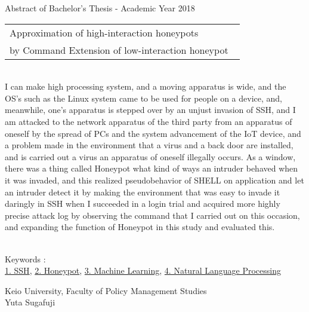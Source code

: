 Abstract of Bachelor's Thesis - Academic Year 2018
\begin{center}
\begin{large}
\begin{tabular}{|p{0.97\linewidth}|}
    \hline
        Approximation of high-interaction honeypots\\ 
by Command Extension of low-interaction honeypot\\
    \hline
\end{tabular}
\end{large}
\end{center}

~ \\
\renewcommand{\baselinestretch}{0.9}
I can make high processing system, and a moving apparatus is wide, and the OS's such as the Linux system came to be used for people on a device, and, meanwhile, one's apparatus is stepped over by an unjust invasion of SSH, and I am attacked to the network apparatus of the third party from an apparatus of oneself by the spread of PCs and the system advancement of the IoT device, and a problem made in the environment that a virus and a back door are installed, and is carried out a virus an apparatus of oneself illegally occurs.
As a window, there was a thing called Honeypot what kind of ways an intruder behaved when it was invaded, and this realized pseudobehavior of SHELL on application and let an intruder detect it by making the environment that was easy to invade it daringly in SSH when I succeeded in a login trial and acquired more highly precise attack log by observing the command that I carried out on this occasion, and expanding the function of Honeypot in this study and evaluated this.
\renewcommand{\baselinestretch}{1.0}

~ \\
Keywords : \\
\underline{1. SSH},
\underline{2. Honeypot},
\underline{3. Machine Learning},
\underline{4. Natural Language Processing}
\begin{flushright}
Keio University, Faculty of Policy Management Studies\\
Yuta Sugafuji
\end{flushright}
